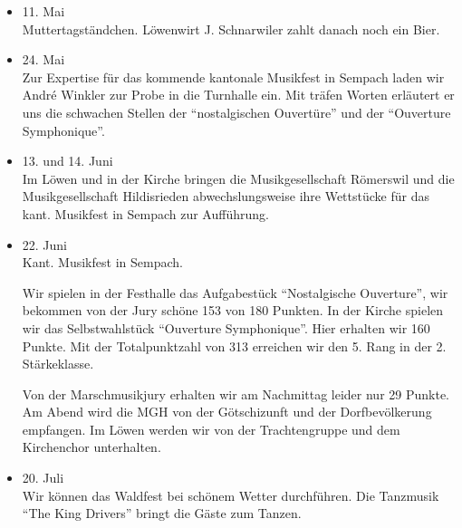 \begin{multicols}{2}
\begin{itemize}
        \item[]11. Mai\\
        Muttertagständchen. Löwenwirt J. Schnarwiler zahlt danach noch ein Bier.

        \item[]24. Mai\\
        Zur Expertise für das kommende kantonale Musikfest in Sempach laden wir
        André Winkler zur Probe in die Turnhalle ein. Mit träfen Worten
        erläutert er uns die schwachen Stellen der \enquote{nostalgischen Ouvertüre}
        und der \enquote{Ouverture Symphonique}.

        \item[]13. und 14. Juni\\
        Im Löwen und in der Kirche bringen die Musikgesellschaft Römerswil und
        die Musikgesellschaft Hildisrieden abwechslungsweise ihre Wettstücke für
        das kant. Musikfest in Sempach zur Aufführung.

        \item[]22. Juni\\
        Kant. Musikfest in Sempach.

        Wir spielen in der Festhalle das Aufgabestück \enquote{Nostalgische
            Ouverture}, wir bekommen von der Jury schöne 153 von 180 Punkten. In
        der Kirche spielen wir das Selbstwahlstück \enquote{Ouverture
            Symphonique}. Hier erhalten wir 160 Punkte. Mit der Totalpunktzahl
        von 313 erreichen wir den 5. Rang in der 2. Stärkeklasse.

        Von der Marschmusikjury erhalten wir am Nachmittag leider nur 29 Punkte.
        Am Abend wird die MGH von der Götschizunft und der Dorfbevölkerung
        empfangen. Im Löwen werden wir von der Trachtengruppe und dem
        Kirchenchor unterhalten.

        \item[]20. Juli\\
        Wir können das Waldfest bei schönem Wetter durchführen. Die Tanzmusik
        \enquote{The King Drivers} bringt die Gäste zum Tanzen.



    \end{itemize}

\end{multicols}
